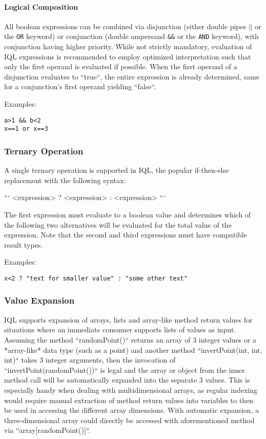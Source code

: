 \documentclass[11pt]{article}
\begin{document}
\paragraph{Logical Composition}
\label{sec:logical-composition}

All boolean expressions can be combined via disjunction (either double pipes \texttt{$||$} or the \texttt{OR} keyword) or conjunction (double ampersand \texttt{\&\&} or the \texttt{AND} keyword), with conjunction having higher priority. While not strictly mandatory, evaluation of IQL expressions is recommended to employ optimized interpretation such that only the first operand is evaluated if possible. When the first operand of a disjunction evaluates to ``true``, the entire expression is already determined, same for a conjunction's first operand yielding ``false``.  

Examples:

\begin{verbatim}
a>1 && b<2
x==1 or x==3
\end{verbatim}

\subsubsection{Ternary Operation}
\label{sec:ternary-operation}

A single ternary operation is supported in IQL, the popular if-then-else replacement with the following syntax:

```
<expression> ? <expression> : <expression>
```

The first expression must evaluate to a boolean value and determines which of the following two alternatives will be evaluated for the total value of the expression. Note that the second and third expressions must have compatible result types.

Examples:

\begin{verbatim}
x<2 ? "text for smaller value" : "some other text"
\end{verbatim}

\subsubsection{Value Expansion}
\label{sec:value-expansion}

IQL supports expansion of arrays, lists and array-like method return values for situations where an immediate consumer supports lists of values as input. Assuming the method ``randomPoint()`` returns an array of 3 integer values or a *array-like* data type (such as a point) and another method ``invertPoint(int, int, int)`` takes 3 integer arguments, then the invocation of ``invertPoint(randomPoint())`` is legal and the array or object from the inner method call will be automatically expanded into the separate 3 values. This is especially handy when dealing with multidimensional arrays, as regular indexing would require manual extraction of method return values into variables to then be used in accessing the different array dimensions. With automatic expansion, a three-dimensional array could directly be accessed with aforementioned method via ``array[randomPoint()]``.
\end{document}
